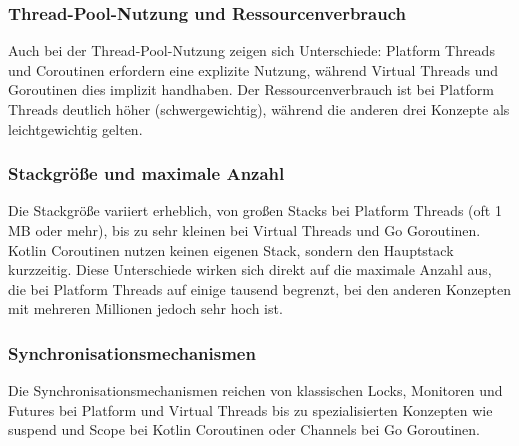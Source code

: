 \documentclass[fontsize=12pt,paper=a4,twoside=semi,parskip=half-,headsepline,headinclude]{scrreprt}
\begin{document}
\subsubsection{Thread-Pool-Nutzung und Ressourcenverbrauch}

Auch bei der Thread-Pool-Nutzung zeigen sich Unterschiede: Platform Threads und Coroutinen erfordern eine explizite Nutzung, während Virtual Threads und Goroutinen dies implizit handhaben. Der Ressourcenverbrauch ist bei Platform Threads deutlich höher (schwergewichtig), während die anderen drei Konzepte als leichtgewichtig gelten.

\subsubsection{Stackgröße und maximale Anzahl}

Die Stackgröße variiert erheblich, von großen Stacks bei Platform Threads (oft 1 MB oder mehr), bis zu sehr kleinen bei Virtual Threads und Go Goroutinen. Kotlin Coroutinen nutzen keinen eigenen Stack, sondern den Hauptstack kurzzeitig. Diese Unterschiede wirken sich direkt auf die maximale Anzahl aus, die bei Platform Threads auf einige tausend begrenzt, bei den anderen Konzepten mit mehreren Millionen jedoch sehr hoch ist.

\subsubsection{Synchronisationsmechanismen}

Die Synchronisationsmechanismen reichen von klassischen Locks, Monitoren und Futures bei Platform und Virtual Threads bis zu spezialisierten Konzepten wie suspend und Scope bei Kotlin Coroutinen oder Channels bei Go Goroutinen. 
\end{document}
